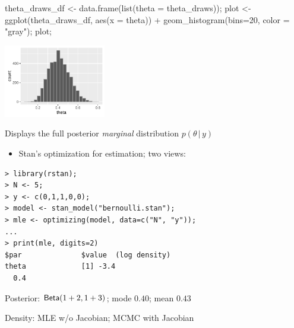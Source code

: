 \documentclass[10pt]{report}
\begin{document}
%
\begin{codein}
theta_draws_df <- data.frame(list(theta = theta_draws));
plot <-
  ggplot(theta_draws_df, aes(x = theta)) +
  geom_histogram(bins=20, color = "gray");
plot;
\end{codein}
\vspace*{-9pt}
\begin{center}
\includegraphics[height=1.25in]{img/bern-posterior-histogram.pdf}
\end{center}
\vspace*{-0.1in}
\begin{subitemize}
\item
Displays the full posterior {\slshape marginal} distribution $p(\theta \,
| \, y)$
\end{subitemize}



%
\begin{itemize}
\item Stan's optimization for estimation; two views:
\end{itemize}
\begin{center}
\begin{minipage}[t]{0.8\textwidth}\small
\begin{Verbatim}
> library(rstan);
> N <- 5;
> y <- c(0,1,1,0,0);
> model <- stan_model("bernoulli.stan");
> mle <- optimizing(model, data=c("N", "y"));
...
> print(mle, digits=2)
$par              $value  (log density)
theta             [1] -3.4
  0.4 
\end{Verbatim}
\begin{subitemize}
\item Posterior: $\text{\sf Beta}(1+2, 1+3)$;  mode $0.40$; mean $0.43$
\item Density: MLE w/o Jacobian;  MCMC with Jacobian
\end{subitemize}
\end{minipage}
\end{center}
\end{document}
